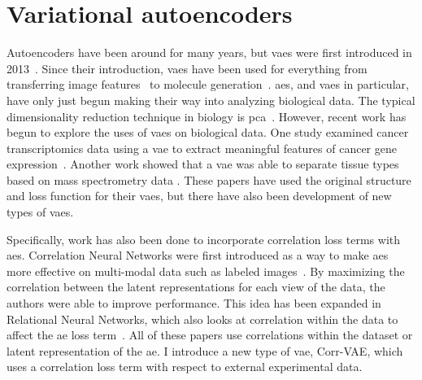 \section{Variational autoencoders}
Autoencoders have been around for many years, but \glspl{vae} were first introduced in 2013~\cite{kingma2013auto, rezende2014stochastic}.
Since their introduction, \glspl{vae} have been used for everything from transferring image features~\cite{larsen2015autoencoding} to molecule generation~\cite{gomez2016automatic}.
\glspl{ae}, and \glspl{vae} in particular, have only just begun making their way into analyzing biological data.
The typical dimensionality reduction technique in biology is \gls{pca}~\cite{ringner2008principal}.
However, recent work has begun to explore the uses of \glspl{vae} on biological data.
One study examined cancer transcriptomics data using a \gls{vae} to extract meaningful features of cancer gene expression~\cite{way2017extracting}.
Another work showed that a \gls{vae} was able to separate tissue types based on mass spectrometry data \cite{inglese2017variational}.
These papers have used the original structure and loss function for their \glspl{vae}, but there have also been development of new types of \glspl{vae}.

Specifically, work has also been done to incorporate correlation loss terms with \glspl{ae}.
Correlation Neural Networks were first introduced as a way to make \glspl{ae} more effective on multi-modal data such as labeled images~\cite{chandar2016correlational}.
By maximizing the correlation between the latent representations for each view of the data, the authors were able to improve performance.
This idea has been expanded in Relational Neural Networks, which also looks at correlation within the data to affect the \gls{ae} loss term~\cite{meng2017relational}.
All of these papers use correlations within the dataset or latent representation of the \gls{ae}.
I introduce a new type of \gls{vae}, Corr-VAE, which uses a correlation loss term with respect to external experimental data.